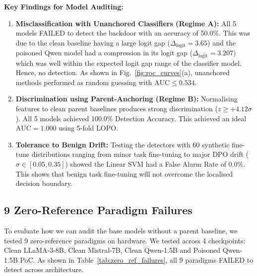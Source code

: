 \noindent\textbf{Key Findings for Model Auditing:}
\begin{enumerate}
    \item \textbf{Misclassification with Unanchored Classifiers (Regime A):} All 5 models FAILED to detect the backdoor with an accuracy of 50.0\%. This was due to the clean baseline having a large logit gap ($\Delta_{\text{logit}}= 3.65$) and the poisoned Qwen model had a compression in its logit gap ($\Delta_{\text{logit}}= 3.207$) which was well within the expected logit gap range of the classifier model. Hence, no detection. As shown in Fig.~\ref{fig:roc_curves}(a), unanchored methods performed as random guessing with $\text{AUC} \le 0.534$.
    \item \textbf{Discrimination using Parent-Anchoring (Regime B):} Normalising features to clean parent baselines produces strong discrimination ($z \ge +4.12\sigma$). All 5 models achieved 100.0\% Detection Accuracy. This achieved an ideal $\text{AUC} = 1.000$ using 5-fold LOPO.
    \item \textbf{Tolerance to Benign Drift:} Testing the detectors with 60 synthetic fine-tune distributions ranging from minor task fine-tuning to major DPO drift ($\sigma \in [0.05, 0.35]$) showed the Linear SVM had a False Alarm Rate of 0.0\%. This shows that benign task fine-tuning will not overcome the localised decision boundary.
\end{enumerate}

\subsection{9 Zero-Reference Paradigm Failures}
\label{subsec:exp_zero_ref}

To evaluate how we can audit the base models without a parent baseline, we tested 9 zero-reference paradigms on hardware. We tested across 4 checkpoints: Clean LLaMA-3-8B, Clean Mistral-7B, Clean Qwen-1.5B and Poisoned Qwen-1.5B PoC. As shown in Table~\ref{tab:zero_ref_failures}, all 9 paradigms FAILED to detect across architecture.

